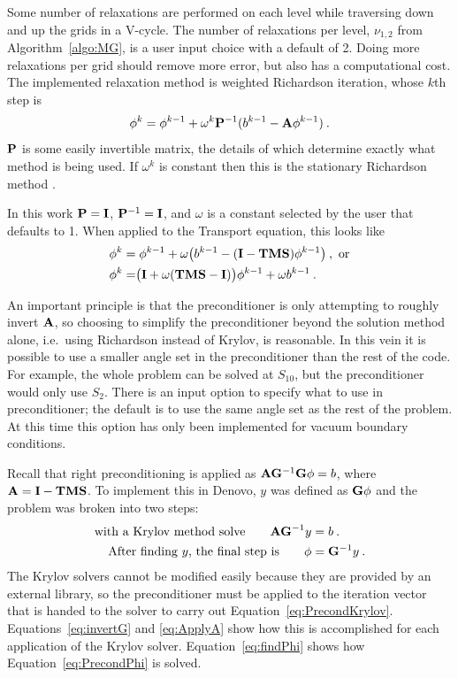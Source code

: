 Some number of relaxations are performed on each level while traversing down and up the grids in a V-cycle. The number of relaxations per level, $\nu_{1,2}$ from Algorithm~\ref{algo:MG}, is a user input choice with a default of 2. Doing more relaxations per grid should remove more error, but also has a computational cost. The implemented relaxation method is weighted Richardson iteration, whose $k$th step is
%
\begin{equation}
  \phi^{k} = \phi^{k-1} + \omega^{k}\mathbf{P}^{-1}(b^{k-1} - \mathbf{A}\phi^{k-1}) \:.
  \label{eq:Richardson}
\end{equation}
%
$\mathbf{P}$ is some easily invertible matrix, the details of which determine exactly what method is being used. If $\omega^{k}$ is constant then this is the stationary Richardson method \cite{Moore1999}. 

In this work $\mathbf{P} = \mathbf{I}$, $\mathbf{P}^{-1} = \mathbf{I}$, and $\omega$ is a constant selected by the user that defaults to 1. When applied to the Transport equation, this looks like
%
\begin{align}
  \phi^{k} &= \phi^{k-1} + \omega\bigr(b^{k-1} - (\mathbf{I} - \mathbf{TMS})\phi^{k-1}\bigl) \:, \text{ or} \nonumber \\
  \phi^{k} &= \bigr(\mathbf{I} + \omega(\mathbf{TMS} - \mathbf{I})\bigl)\phi^{k-1} + \omega b^{k-1} \:.
  \label{eq:relax}
 \end{align}
  
An important principle is that the preconditioner is only attempting to roughly invert $\mathbf{A}$, so choosing to simplify the preconditioner beyond the solution method alone, i.e.\ using Richardson instead of Krylov, is reasonable. In this vein it is possible to use a smaller angle set in the preconditioner than the rest of the code. For example, the whole problem can be solved at $S_{10}$, but the preconditioner would only use $S_{2}$. There is an input option to specify what to use in preconditioner; the default is to use the same angle set as the rest of the problem. At this time this option has only been implemented for vacuum boundary conditions. 

Recall that right preconditioning is applied as $\mathbf{A} \mathbf{G}^{-1} \mathbf{G} \phi = b$, where $\mathbf{A} = \mathbf{I} - \mathbf{TMS}$. To implement this in Denovo, $y$ was defined as $\mathbf{G}\phi$ and the problem was broken into two steps: 
%
\begin{align}
  \text{with a Krylov method solve} \qquad \mathbf{AG}^{-1}y &= b \:. \label{eq:PrecondKrylov} \\
  \text{After finding }y\text{, the final step is} \qquad \phi &= \mathbf{G}^{-1}y \:. \label{eq:PrecondPhi}
\end{align}
%
The Krylov solvers cannot be modified easily because they are provided by an external library, so the preconditioner must be applied to the iteration vector that is handed to the solver to carry out Equation~\eqref{eq:PrecondKrylov}. Equations~\eqref{eq:invertG} and \eqref{eq:ApplyA} show how this is accomplished for each application of the Krylov solver. Equation~\eqref{eq:findPhi} shows how Equation~\ref{eq:PrecondPhi} is solved.  

